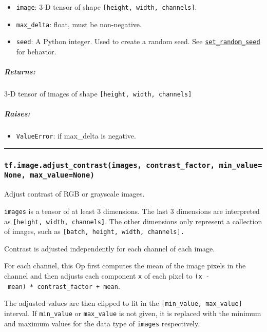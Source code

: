 \begin{itemize}
\tightlist
\item
  \texttt{image}: 3-D tensor of shape
  \texttt{{[}height,\ width,\ channels{]}}.
\item
  \texttt{max\_delta}: float, must be non-negative.
\item
  \texttt{seed}: A Python integer. Used to create a random seed. See
  \href{../../api_docs/python/constant_op.md\#set_random_seed}{\texttt{set\_random\_seed}}
  for behavior.
\end{itemize}

\subparagraph{Returns: }\label{returns-20}

3-D tensor of images of shape \texttt{{[}height,\ width,\ channels{]}}

\subparagraph{Raises: }\label{raises-9}

\begin{itemize}
\tightlist
\item
  \texttt{ValueError}: if max\_delta is negative.
\end{itemize}

\begin{center}\rule{0.5\linewidth}{\linethickness}\end{center}

\subsubsection{\texorpdfstring{\texttt{tf.image.adjust\_contrast(images,\ contrast\_factor,\ min\_value=None,\ max\_value=None)}
}{tf.image.adjust\_contrast(images, contrast\_factor, min\_value=None, max\_value=None) }}\label{tf.image.adjustux5fcontrastimages-contrastux5ffactor-minux5fvaluenone-maxux5fvaluenone}

Adjust contrast of RGB or grayscale images.

\texttt{images} is a tensor of at least 3 dimensions. The last 3
dimensions are interpreted as \texttt{{[}height,\ width,\ channels{]}}.
The other dimensions only represent a collection of images, such as
\texttt{{[}batch,\ height,\ width,\ channels{]}.}

Contrast is adjusted independently for each channel of each image.

For each channel, this Op first computes the mean of the image pixels in
the channel and then adjusts each component \texttt{x} of each pixel to
\texttt{(x\ -\ mean)\ *\ contrast\_factor\ +\ mean}.

The adjusted values are then clipped to fit in the
\texttt{{[}min\_value,\ max\_value{]}} interval. If \texttt{min\_value}
or \texttt{max\_value} is not given, it is replaced with the minimum and
maximum values for the data type of \texttt{images} respectively.

